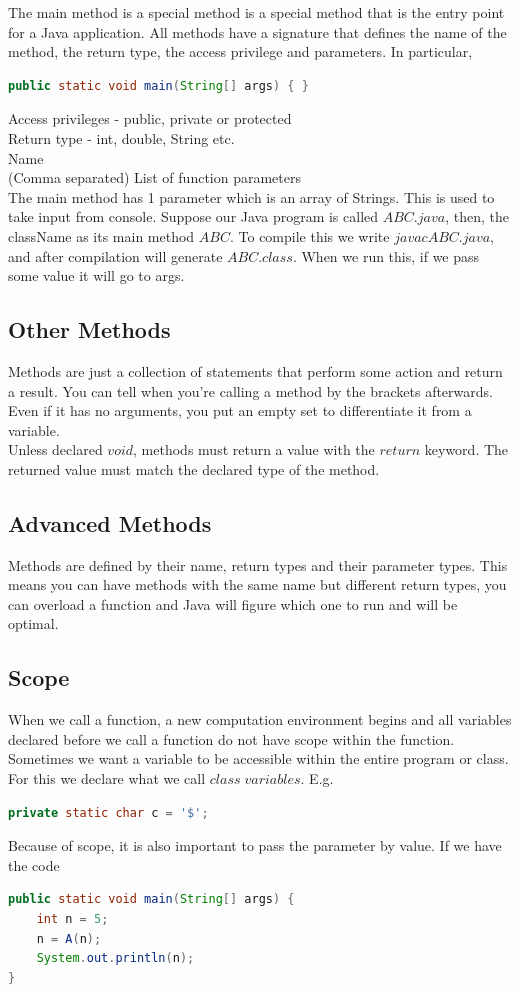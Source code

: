 \documentclass[11pt,a4 paper]{book}
\theoremstyle{plain}
\theoremstyle{definition}
\theoremstyle{remark}
\begin{document}
\begin{flushleft}
The main method is a special method is a special method that is the entry point for a Java application.
All methods have a signature that defines the name of the method, the return type, the access privilege and parameters. In particular,
\begin{lstlisting}[language = Java]
public static void main(String[] args) { }
\end{lstlisting}
Access privileges - public, private or protected \\
Return type - int, double, String etc. \\
Name \\
(Comma separated) List of function parameters \\
The main method has 1 parameter which is an array of Strings. This is used to take input from console. Suppose our Java program is called $ABC.java$, then, the className as its main method $ABC$. To compile this we write $javac ABC.java$, and after compilation will generate $ABC.class$. When we run this, if we pass some value it will go to args.
\subsection{Other Methods}
Methods are just a collection of statements that perform some action and return a result. You can tell when you're calling a method by the brackets afterwards. Even if it has no arguments, you put an empty set to differentiate it from a variable. \\
Unless declared $void$, methods must return a value with the $return$ keyword. The returned value must match the declared type of the method.
\subsection{Advanced Methods}
Methods are defined by their name, return types and their parameter types. This means you can have methods with the same name but different return types, you can overload a function and Java will figure which one to run and will be optimal.
\subsection{Scope}
When we call a function, a new computation environment begins and all variables declared before we call a function do not have scope within the function. Sometimes we want a variable to be accessible within the entire program or class. For this we declare what we call $class \; variables$. E.g.
\begin{lstlisting}[language = Java]
private static char c = '$';
\end{lstlisting}
Because of scope, it is also important to pass the parameter by value. If we have the code
\begin{lstlisting}[language = Java]
public static void main(String[] args) {
	int n = 5;
	n = A(n);
	System.out.println(n);
}


\end{lstlisting}
\end{flushleft}
\end{document}
